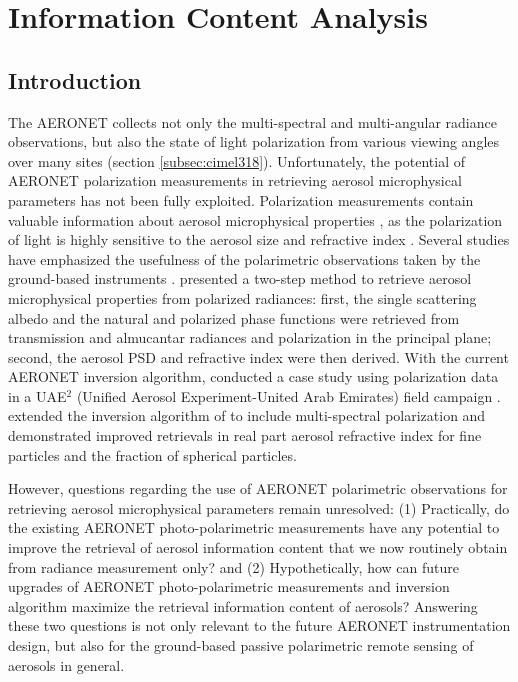 \chapter{Information Content Analysis} \label{ch:info}

\section{Introduction}

The AERONET collects not only the multi-spectral and multi-angular radiance
observations, but also the state of light polarization from various viewing
angles over many sites (section \ref{subsec:cimel318}). 
Unfortunately, the potential of AERONET polarization
measurements in retrieving aerosol microphysical parameters has not been fully
exploited. Polarization measurements contain valuable information about aerosol
microphysical properties \citep{Mishchenko97,Cairns97}, as
the polarization of light is highly sensitive to the aerosol size and
refractive index \citep{Hansen74}. Several studies have emphasized the
usefulness of the polarimetric observations taken by the ground-based
instruments \citep{Cairns97, Boesche06, Emde10, Zeng08}.  
\citet{Vermeulen00} presented a two-step method to retrieve
aerosol microphysical properties from polarized radiances: first, the single
scattering albedo and the natural and polarized phase functions were retrieved
from transmission and almucantar radiances and polarization in the principal
plane; second, the aerosol PSD and refractive index were then derived. With the
current AERONET inversion algorithm, \citet{Dubovik06} conducted a case
study using polarization data in a UAE$^2$ (Unified Aerosol Experiment-United 
Arab Emirates) field campaign \citep{Reid08}. \citet{Li09} extended the
inversion algorithm of \citet{Dubovik06} to include multi-spectral
polarization and demonstrated improved retrievals in real part aerosol
refractive index for fine particles and the fraction of spherical particles.

However, questions regarding the use of AERONET polarimetric observations for
retrieving aerosol microphysical parameters remain unresolved: (1) Practically,
do the existing AERONET photo-polarimetric measurements have any potential to
improve the retrieval of aerosol information content that we now routinely
obtain from radiance measurement only? and (2) Hypothetically, how can future
upgrades of AERONET photo-polarimetric measurements and inversion algorithm
maximize the retrieval information content of aerosols? Answering these two
questions is not only relevant to the future AERONET instrumentation design,
but also for the ground-based passive polarimetric remote sensing of aerosols
in general. 


